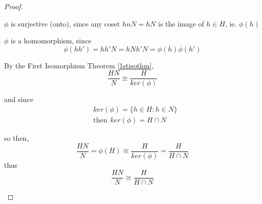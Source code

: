 \documentclass{article}
\theoremstyle{definition}
\begin{document}
\begin{proof}
\begin{enumerate}[i.]
      $\phi$ is surjective (onto), since any coset $hnN=hN$ is the image of $h \in H$, ie. $\phi(h)$

      $\phi$ is a homomorphism, since
      $$\phi(h h') = h h' N = hN h'N = \phi(h)\phi(h')$$

      By the First Isomorphism Theorem \ref{1stisothm},
      $$\frac{HN}{N} \cong \frac{H}{ker(\phi)}$$

      and since
      \begin{align*}
	&ker(\phi) = \{ h \in H : h \in N\}\\
	&\text{then}~~ker(\phi) = H \cap N
      \end{align*}

      so then,
      $$\frac{HN}{N} = \phi(H) \cong \frac{H}{ker(\phi)} = \frac{H}{H \cap N}$$
      thus
      $$\frac{HN}{N} \cong \frac{H}{H \cap N}$$

  \end{enumerate}
\end{proof}
\end{document}
